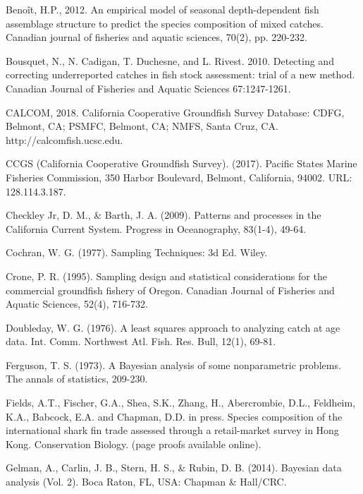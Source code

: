 \documentclass[12pt]{article}
\begin{document}
%
\begin{thebibliography}{1}
%
 Benoît, H.P., 2012. An empirical model of seasonal 
depth-dependent fish assemblage structure to predict the species composition 
of mixed catches.  Canadian journal of fisheries and aquatic sciences, 70(2), 
pp. 220-232.

%
 Bousquet, N., N. Cadigan, T. Duchesne, and L. Rivest. 
2010. Detecting and correcting underreported catches in fish stock assessment: 
trial of a new method. Canadian Journal of Fisheries and Aquatic Sciences 
67:1247-1261.

 CALCOM, 2018. California Cooperative Groundfish Survey 
Database: CDFG, Belmont, CA; PSMFC, Belmont, CA; NMFS, Santa Cruz, CA. 
http://calcomfish.ucsc.edu.

%
 CCGS (California Cooperative Groundfish Survey). (2017). 
Pacific States Marine Fisheries Commission, 350 Harbor Boulevard, Belmont, 
California, 94002. URL:  128.114.3.187.

%
 Checkley Jr, D. M., \& Barth, J. A. (2009). Patterns and processes in 
the California Current System. Progress in Oceanography, 83(1-4), 49-64.

%
 Cochran, W. G. (1977). Sampling Techniques: 3d Ed. Wiley.

%
 Crone, P. R. (1995). Sampling design and statistical 
considerations for the commercial groundfish fishery of Oregon. Canadian 
Journal of Fisheries and Aquatic Sciences, 52(4), 716-732.

%
 Doubleday, W. G. (1976). A least squares approach to 
analyzing catch at age data. Int. Comm. Northwest Atl. Fish. Res. Bull, 12(1), 
69-81.

%
 Ferguson, T. S. (1973). A Bayesian analysis of some nonparametric 
problems. The annals of statistics, 209-230.

%
 Fields, A.T., Fischer, G.A., Shea, S.K., Zhang, H., 
Abercrombie, D.L., Feldheim, K.A., Babcock, E.A. and Chapman, D.D. in press. 
Species composition of the international shark fin trade assessed through a 
retail-market survey in Hong Kong. Conservation Biology. 
(page proofs available online).

%
 Gelman, A., Carlin, J. B., Stern, H. S., \& Rubin, D. B. 
(2014). Bayesian data analysis (Vol. 2). Boca Raton, FL, USA: Chapman \& 
Hall/CRC.


\end{thebibliography}
\end{document}
